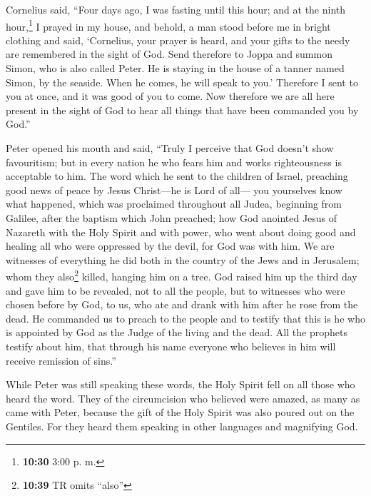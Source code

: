  Cornelius said, ``Four days ago, I was fasting until
this hour; and at the ninth hour,\footnote{\textbf{10:30} 3:00 p. m.} I
prayed in my house, and behold, a man stood before me in bright clothing
 and said, `Cornelius, your prayer is heard, and your
gifts to the needy are remembered in the sight of God. 
Send therefore to Joppa and summon Simon, who is also called Peter. He
is staying in the house of a tanner named Simon, by the seaside. When he
comes, he will speak to you.'  Therefore I sent to you at
once, and it was good of you to come. Now therefore we are all here
present in the sight of God to hear all things that have been commanded
you by God.''

 Peter opened his mouth and said, ``Truly I perceive that
God doesn't show favouritism;  but in every nation he who
fears him and works righteousness is acceptable to him. 
The word which he sent to the children of Israel, preaching good news of
peace by Jesus Christ---he is Lord of all---  you
yourselves know what happened, which was proclaimed throughout all
Judea, beginning from Galilee, after the baptism which John preached;
 how God anointed Jesus of Nazareth with the Holy Spirit
and with power, who went about doing good and healing all who were
oppressed by the devil, for God was with him.  We are
witnesses of everything he did both in the country of the Jews and in
Jerusalem; whom they also\footnote{\textbf{10:39} TR omits ``also''}
killed, hanging him on a tree.  God raised him up the
third day and gave him to be revealed,  not to all the
people, but to witnesses who were chosen before by God, to us, who ate
and drank with him after he rose from the dead.  He
commanded us to preach to the people and to testify that this is he who
is appointed by God as the Judge of the living and the dead.
 All the prophets testify about him, that through his
name everyone who believes in him will receive remission of sins.''

 While Peter was still speaking these words, the Holy
Spirit fell on all those who heard the word.  They of the
circumcision who believed were amazed, as many as came with Peter,
because the gift of the Holy Spirit was also poured out on the Gentiles.
 For they heard them speaking in other languages and
magnifying God.

